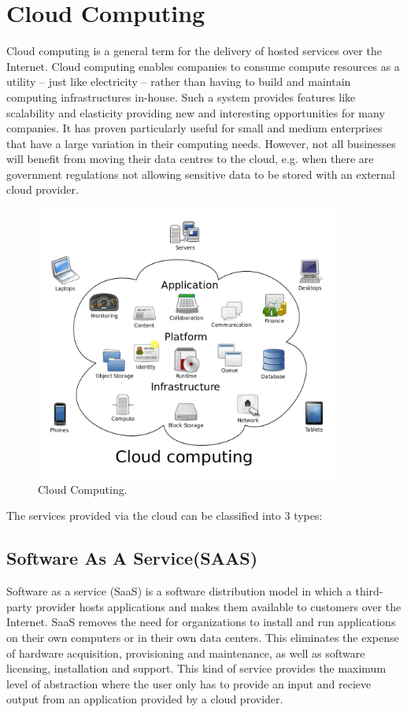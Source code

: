 \section{Cloud Computing}
Cloud computing is a general term for the delivery of hosted services over
the Internet.
Cloud computing enables companies to consume compute resources as a
utility – just like electricity – rather than having to build and maintain
computing infrastructures in-house. Such a system provides features like scalability and elasticity providing new and interesting opportunities for many
companies. It has proven particularly useful for small and
medium enterprises that have a large variation in their
computing needs. However, not all businesses will
benefit from moving their data centres to the cloud, e.g.
when there are government regulations not allowing sensitive data to be stored with an external cloud provider.
\begin{figure}
\centering
\includegraphics[width=10cm]{images/cc.png}
\caption{\label{fig:cc}Cloud Computing.}
\end{figure} 

The services provided via the cloud can be classified into 3 types:
\subsection{Software As A Service(SAAS)}
Software as a service (SaaS) is a software distribution model in which a third-party provider hosts applications and makes them available to customers over the Internet. SaaS removes the need for organizations to install and run applications on their own computers or in their own data centers. This eliminates the expense of hardware acquisition, provisioning and maintenance, as well as software licensing, installation and support. This kind of service provides the maximum level of abstraction where the user only has to provide an input and recieve output from an application provided by a cloud provider.

